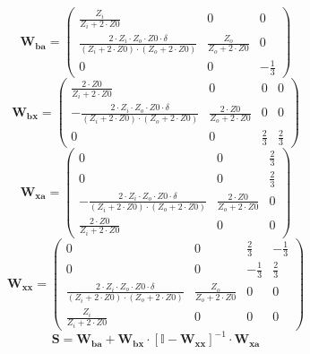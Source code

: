 \[ \mathbf{W_{ba}} = \left(\begin{smallmatrix} \frac{Z_i}{Z_i+2\cdot
Z0} & 0 & 0 \\ \frac{2\cdot Z_i\cdot Z_o\cdot Z0\cdot
\delta}{\left(Z_i+2\cdot Z0\right)\cdot\left(Z_o+2\cdot Z0\right)} &
\frac{Z_o}{Z_o+2\cdot Z0} & 0 \\ 0 & 0 & -\frac{1}{3}
\end{smallmatrix}\right) \]
\[ \mathbf{W_{bx}} = \left(\begin{smallmatrix} \frac{2\cdot
Z0}{Z_i+2\cdot Z0} & 0 & 0 & 0 \\ -\frac{2\cdot Z_i\cdot Z_o\cdot
Z0\cdot \delta}{\left(Z_i+2\cdot Z0\right)\cdot\left(Z_o+2\cdot
Z0\right)} & \frac{2\cdot Z0}{Z_o+2\cdot Z0} & 0 & 0 \\ 0 & 0 &
\frac{2}{3} & \frac{2}{3} \end{smallmatrix}\right) \]
\[ \mathbf{W_{xa}} = \left(\begin{smallmatrix} 0 & 0 & \frac{2}{3} \\
0 & 0 & \frac{2}{3} \\ -\frac{2\cdot Z_i\cdot Z_o\cdot Z0\cdot
\delta}{\left(Z_i+2\cdot Z0\right)\cdot\left(Z_o+2\cdot Z0\right)} &
\frac{2\cdot Z0}{Z_o+2\cdot Z0} & 0 \\ \frac{2\cdot Z0}{Z_i+2\cdot Z0}
& 0 & 0 \end{smallmatrix}\right) \]
\[ \mathbf{W_{xx}} = \left(\begin{smallmatrix} 0 & 0 & \frac{2}{3} &
-\frac{1}{3} \\ 0 & 0 & -\frac{1}{3} & \frac{2}{3} \\ \frac{2\cdot
Z_i\cdot Z_o\cdot Z0\cdot \delta}{\left(Z_i+2\cdot
Z0\right)\cdot\left(Z_o+2\cdot Z0\right)} & \frac{Z_o}{Z_o+2\cdot Z0}
& 0 & 0 \\ \frac{Z_i}{Z_i+2\cdot Z0} & 0 & 0 & 0
\end{smallmatrix}\right) \]
\[ \mathbf{S}=\mathbf{W_{ba}}+\mathbf{W_{bx}}\cdot\left[ \mathbb{I}
-\mathbf{W_{xx}}\right]^{-1}\cdot\mathbf{W_{xa}} \]
